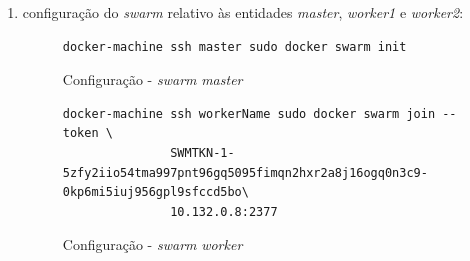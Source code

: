 \documentclass[a4paper]{report}
\begin{document}
{\begin{enumerate}[label=\textbf{\arabic*.}]
                \begin{figure}[H]
                    \centering
                    \begin{verbatim}
docker-machine create \
               --driver google --google-project ferrous-aleph-271712 \
               --google-zone europe-west1-b \
               --google-machine-type n1-standard-2 \
               --google-disk-size=100 \
               --google-disk-type=pd-ssd \
               --google-machine-image \
       https://www.googleapis.com/compute/v1/projects/centos-cloud/global/images/centos-7-v20200309 \
               workerName
                    \end{verbatim}
                    \vspace{-5mm}
                    \caption{Configuração - Criação de uma instância \textsl{worker}}
                    \label{fig:2}
                \end{figure}

                De salientar que a designação \texttt{ferrous-aleph-271712} corresponde ao identificador do projeto presente na plataforma \textit{Google Cloud} de um dos elementos que compõem este grupo.
                Assim, esta denominação deve ser substituída pelo nome do projeto do utilizador. Relativamente à designação \textit{workerName}, esta deve ser subtituída pelos nomes das entidades \textit{worker} referidas no ponto acima (\textsl{worker1} e \textsl{worker2}).

                \item configuração do \textit{swarm} relativo às entidades \textsl{master}, \textsl{worker1} e \textsl{worker2}:
                \begin{figure}[H]
                    \centering
                    \begin{verbatim}
docker-machine ssh master sudo docker swarm init
                    \end{verbatim}
                    \vspace{-5mm}
                    \caption{Configuração - \textit{swarm} \textsl{master}}
                    \label{fig:4}
                \end{figure}

                \begin{figure}[H]
                    \centering
                    \begin{verbatim}
docker-machine ssh workerName sudo docker swarm join --token \
               SWMTKN-1-5zfy2iio54tma997pnt96gq5095fimqn2hxr2a8j16ogq0n3c9-0kp6mi5iuj956gpl9sfccd5bo\
               10.132.0.8:2377
                    \end{verbatim}
                    \vspace{-5mm}
                    \caption{Configuração - \textit{swarm} \textsl{worker}}
                    \label{fig:5}
                \end{figure}


\end{enumerate}}
\end{document}
